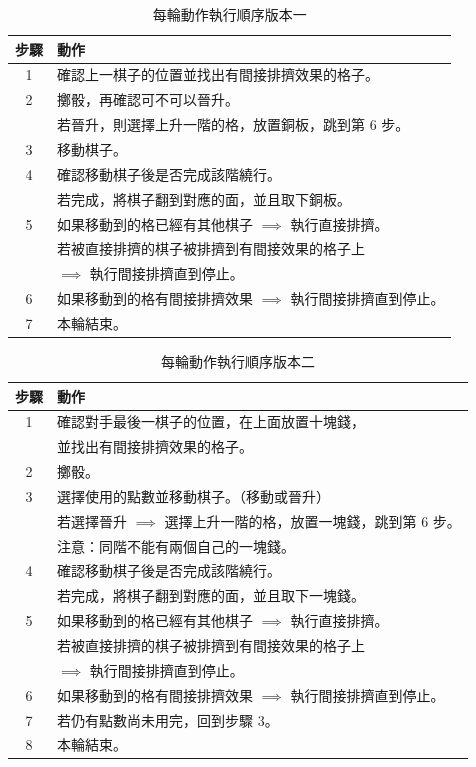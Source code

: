 \documentclass[11pt,a4paper]{article}
\begin{document}
\begin{table} 
	\caption{每輪動作執行順序版本一}
	\label{order_one}
	\centering
	\vspace{0.1cm}
	\begin{tabular}{cl}
		\toprule
			步驟 & 動作\\
		\midrule
			1 & 確認上一棋子的位置並找出有間接排擠效果的格子。\\
			2 & 擲骰，再確認可不可以晉升。\\
			  & 若晉升，則選擇上升一階的格，放置銅板，跳到第 6 步。\\
			3 & 移動棋子。\\
			4 & 確認移動棋子後是否完成該階繞行。\\
			  & 若完成，將棋子翻到對應的面，並且取下銅板。\\
			5 & 如果移動到的格已經有其他棋子 $\implies$ 執行直接排擠。\\
			  & 若被直接排擠的棋子被排擠到有間接效果的格子上\\
			  & $\implies$ 執行間接排擠直到停止。\\
			6 & 如果移動到的格有間接排擠效果 $\implies$ 執行間接排擠直到停止。\\
			7 & 本輪結束。\\
		\bottomrule
	\end{tabular}
\end{table}

\begin{table} 
	\caption{每輪動作執行順序版本二}
	\label{order_two}
	\centering
	\vspace{0.1cm}
	\begin{tabular}{cl}
		\toprule
			步驟 & 動作\\
		\midrule
			1 & 確認對手最後一棋子的位置，在上面放置十塊錢，\\
			  & 並找出有間接排擠效果的格子。\\
			2 & 擲骰。\\
			\midrule
			3 & 選擇使用的點數並移動棋子。（移動或晉升）\\
			  & 若選擇晉升 $\implies$ 選擇上升一階的格，放置一塊錢，跳到第 6 步。\\
			  & \textsf{注意}：同階不能有兩個自己的一塊錢。\\
			4 & 確認移動棋子後是否完成該階繞行。\\
			  & 若完成，將棋子翻到對應的面，並且取下一塊錢。\\
			5 & 如果移動到的格已經有其他棋子 $\implies$ 執行直接排擠。\\
			  & 若被直接排擠的棋子被排擠到有間接效果的格子上\\
			  & $\implies$ 執行間接排擠直到停止。\\
			6 & 如果移動到的格有間接排擠效果 $\implies$ 執行間接排擠直到停止。\\
			7 & 若仍有點數尚未用完，回到步驟 3。\\
			8 & 本輪結束。\\
		\bottomrule
	\end{tabular}
\end{table}
\end{document}
